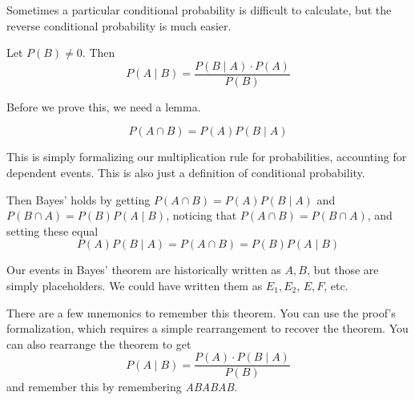 \documentclass[main.tex]{subfiles}
\begin{document}

Sometimes a particular conditional probability is difficult to calculate, but the reverse conditional probability is much easier.

\begin{thm}
	Let \(P(B) \neq 0\). Then \[P(A \mid B) = \frac{P(B \mid A) \cdot P(A)}{P(B)}\]
\end{thm}

Before we prove this, we need a lemma.

\begin{prop}
	\[P(A \cap B) = P(A)P(B \mid A)\]
\end{prop}

This is simply formalizing our multiplication rule for probabilities, accounting for dependent events.
This is also just a definition of conditional probability.

Then Bayes' holds by getting \(P(A \cap B) = P(A)P(B \mid A)\) and \(P(B \cap A) = P(B)P(A \mid B)\), noticing that \(P(A \cap B) = P(B \cap A)\), and setting these equal \[P(A)P(B \mid A) = P(A \cap B) = P(B)P(A \mid B)\]

\begin{rem}
	Our events in Bayes' theorem are historically written as \(A,B\), but those are simply placeholders. We could have written them as \(E_1,E_2\), \(E,F\), etc.
\end{rem}

\begin{rem}
	There are a few mnemonics to remember this theorem. You can use the proof's formalization, which requires a simple rearrangement to recover the theorem. You can also rearrange the theorem to get \[P(A \mid B) = \frac{P(A) \cdot P(B \mid A)}{P(B)}\] and remember this by remembering \textit{ABABAB}.
\end{rem}
\end{document}
